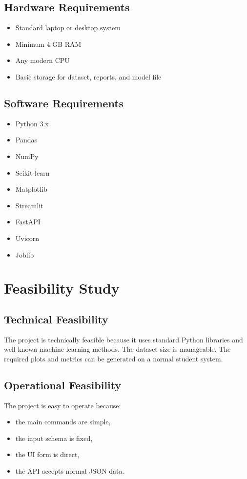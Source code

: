 \documentclass[12pt,a4paper,openany]{report}
\begin{document}
    \section{Hardware Requirements}
    \begin{itemize}[leftmargin=1.4cm]
    \item Standard laptop or desktop system
    \item Minimum 4 GB RAM
    \item Any modern CPU
    \item Basic storage for dataset, reports, and model file
    \end{itemize}

    \section{Software Requirements}
    \begin{itemize}[leftmargin=1.4cm]
    \item Python 3.x
    \item Pandas
    \item NumPy
    \item Scikit-learn
    \item Matplotlib
    \item Streamlit
    \item FastAPI
    \item Uvicorn
    \item Joblib
    \end{itemize}

    \chapter{Feasibility Study}
    \section{Technical Feasibility}
    The project is technically feasible because it uses standard Python libraries and well known machine learning methods. The dataset size is manageable. The required plots and metrics can be generated on a normal student system.

    \section{Operational Feasibility}
    The project is easy to operate because:
    \begin{itemize}[leftmargin=1.4cm]
    \item the main commands are simple,
    \item the input schema is fixed,
    \item the UI form is direct,
    \item the API accepts normal JSON data.
    \end{itemize}
\end{document}
